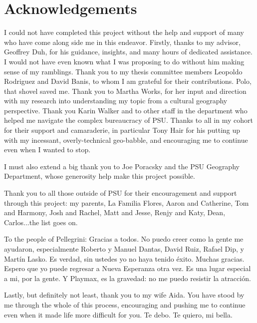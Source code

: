 \chapter*{Acknowledgements}

\pagestyle{headings}

I could not have completed this project without the help and support of many who have come along side me in this endeavor. Firstly, thanks to my advisor, Geoffrey Duh, for his guidance, insights, and many hours of dedicated assistance. I would not have even known what I was proposing to do without him making sense of my ramblings. Thank you to my thesis committee members Leopoldo Rodriguez and David Banis, to whom I am grateful for their contributions. Polo, that shovel saved me. Thank you to Martha Works, for her input and direction with my research into understanding my topic from a cultural geography perspective. Thank you Karin Walker and to other staff in the department who helped me navigate the complex bureaucracy of PSU. Thanks to all in my cohort for their support and camaraderie, in particular Tony Hair for his putting up with my incessant, overly-technical geo-babble, and encouraging me to continue even when I wanted to stop.

I must also extend a big thank you to Joe Poracsky and the PSU Geography Department, whose generosity help make this project possible.

Thank you to all those outside of PSU for their encouragement and support through this project: my parents, La Familia Flores, Aaron and Catherine, Tom and Harmony, Josh and Rachel, Matt and Jesse, Renjy and Katy, Dean, Carlos...the list goes on.


To the people of Pellegrini: Gracias a todos. No puedo creer como la gente me ayudaron, especialmente Roberto y Manuel Dantas, David Ruiz, Rafael Dip, y Martín Lasko. Es verdad, sin ustedes yo no haya tenido éxito. Muchas gracias. Espero que yo puede regresar a Nueva Esperanza otra vez. Es una lugar especial a mi, por la gente. Y Playmax, es la gravedad: no me puedo resistir la atracción.


Lastly, but definitely not least, thank you to my wife Aida. You have stood by me through the whole of this process, encouraging and pushing me to continue even when it made life more difficult for you. Te debo. Te quiero, mi bella.
